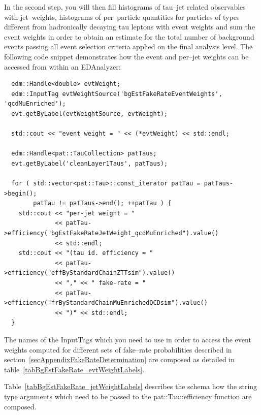 In the second step, you will then fill histograms of tau--jet related observables with jet--weights,
histograms of per--particle quantities for particles of types different from hadronically decaying tau leptons with event weights
and sum the event weights in order to obtain an estimate for the total number of background events 
passing all event selection criteria applied on the final analysis level.
The following code snippet demonstrates how the event and per--jet weights can be accessed from within an EDAnalyzer:
\begin{small}
\begin{verbatim}
  edm::Handle<double> evtWeight;
  edm::InputTag evtWeightSource('bgEstFakeRateEventWeights', 'qcdMuEnriched');
  evt.getByLabel(evtWeightSource, evtWeight);

  std::cout << "event weight = " << (*evtWeight) << std::endl;

  edm::Handle<pat::TauCollection> patTaus;
  evt.getByLabel('cleanLayer1Taus', patTaus);

  for ( std::vector<pat::Tau>::const_iterator patTau = patTaus->begin(); 
        patTau != patTaus->end(); ++patTau ) {
    std::cout << "per-jet weight = " 
              << patTau->efficiency("bgEstFakeRateJetWeight_qcdMuEnriched").value() 
              << std::endl;
    std::cout << "(tau id. efficiency = " 
              << patTau->efficiency("effByStandardChainZTTsim").value() 
              << "," << " fake-rate = " 
              << patTau->efficiency("frByStandardChainMuEnrichedQCDsim").value() 
              << ")" << std::endl;
  }
\end{verbatim}
\end{small}

The names of the InputTags which you need to use in order to access the event weights
computed for different sets of fake--rate probabilities described in section~\ref{secAppendixFakeRateDetermination}
are composed as detailed in table~\ref{tabBgEstFakeRate_evtWeightLabels}.

Table~\ref{tabBgEstFakeRate_jetWeightLabels} describes the schema how the 
string type arguments which need to be passed to the pat::Tau::efficiency function 
are composed.


